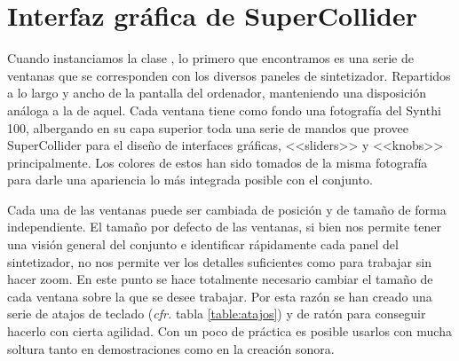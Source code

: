 \section{Interfaz gráfica de SuperCollider}

Cuando instanciamos la clase \texttt{\className}, lo primero que encontramos es una serie de ventanas que se corresponden con los diversos paneles de sintetizador. Repartidos a lo largo y ancho de la pantalla del ordenador, manteniendo una disposición análoga a la de aquel. Cada ventana tiene como fondo una fotografía del Synthi 100, albergando en su capa superior toda una serie de mandos que provee SuperCollider para el diseño de interfaces gráficas, <<sliders>> y <<knobs>> principalmente. Los colores de estos han sido tomados de la misma fotografía para darle una apariencia lo más integrada posible con el conjunto. 
	
Cada una de las ventanas puede ser cambiada de posición y de tamaño de forma independiente. El tamaño por defecto de las ventanas, si bien nos permite tener una visión general del conjunto e identificar rápidamente cada panel del sintetizador, no nos permite ver los detalles suficientes como para trabajar sin hacer zoom. En este punto se hace totalmente necesario cambiar el tamaño de cada ventana sobre la que se desee trabajar. Por esta razón se han creado una serie de atajos de teclado (\textit{cfr.} tabla \ref{table:atajos})  y de ratón para conseguir hacerlo con cierta agilidad. Con un poco de práctica es posible usarlos con mucha soltura tanto en demostraciones como en la creación sonora.
	

